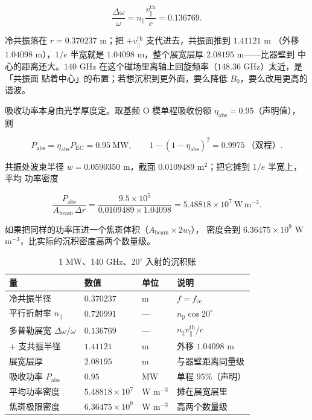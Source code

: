 \begin{equation}
\frac{\Delta\omega}{\omega}=n_\parallel\frac{v_\parallel^\mathrm{th}}{c}=0.136769 .
\label{eq:app-as-dopplerres}
\end{equation}

冷共振落在 $r=0.370237$ m；把 $+v_\parallel^\mathrm{th}$ 支代进去，共振面推到 $1.41121$ m
（外移 $1.04098$ m），$1/e$ 半宽就是 $1.04098$ m，整个展宽层厚 $2.08195$ m——比器壁到
中心的距离还大。$140$ GHz 在这个磁场里离轴上回旋频率（$148.36$ GHz）太近，是「共振面
贴着中心」的布置；若想沉积到更外面，要么降低 $B_0$，要么改用更高的谐波。

吸收功率本身由光学厚度定。取基频 O 模单程吸收份额 $\eta_\mathrm{abs}=0.95$（声明值），
则

\begin{equation}
P_\mathrm{abs}=\eta_\mathrm{abs}P_\mathrm{EC}=0.95\ \mathrm{MW},
\qquad
1-(1-\eta_\mathrm{abs})^2=0.9975\ \text{（双程）}.
\label{eq:app-as-abs}
\end{equation}

共振处波束半径 $w=0.0590350$ m，截面 $0.0109489$ m$^2$；把它摊到 $1/e$ 半宽上，平均
功率密度

\begin{equation}
\frac{P_\mathrm{abs}}{A_\mathrm{beam}\,\Delta r}
=\frac{9.5\times10^{5}}{0.0109489\times1.04098}
=5.48818\times10^{7}\ \mathrm{W\,m^{-3}} .
\label{eq:app-as-powerdens}
\end{equation}

如果把同样的功率压进一个焦斑体积（$A_\mathrm{beam}\times2w_\mathrm{f}$），
密度会到 $6.36475\times10^{9}$ W m$^{-3}$，比实际的沉积密度高两个数量级。

\begin{table}[htbp]
\centering
\small
\caption{1 MW、140 GHz、$20^\circ$ 入射的沉积账}
\label{tab:app-as-deposition}
\begin{tabular}{p{3.4cm}p{3.1cm}p{3.0cm}p{3.5cm}}
\hline
量 & 数值 & 单位 & 说明 \\
\hline
冷共振半径 & $0.370237$ & m & $f=f_\mathrm{ce}$ \\
平行折射率 $n_\parallel$ & $0.720991$ & --- & $n_\mathrm{p}\cos20^\circ$ \\
多普勒展宽 $\Delta\omega/\omega$ & $0.136769$ & --- & $n_\parallel v_\parallel^\mathrm{th}/c$ \\
$+$ 支共振半径 & $1.41121$ & m & 外移 $1.04098$ m \\
展宽层厚 & $2.08195$ & m & 与器壁距离同量级 \\
吸收功率 $P_\mathrm{abs}$ & $0.95$ & MW & 单程 $95\%$（声明） \\
平均功率密度 & $5.48818\times10^{7}$ & W m$^{-3}$ & 摊在展宽层里 \\
焦斑极限密度 & $6.36475\times10^{9}$ & W m$^{-3}$ & 高两个数量级 \\
\hline
\end{tabular}
\end{table}

